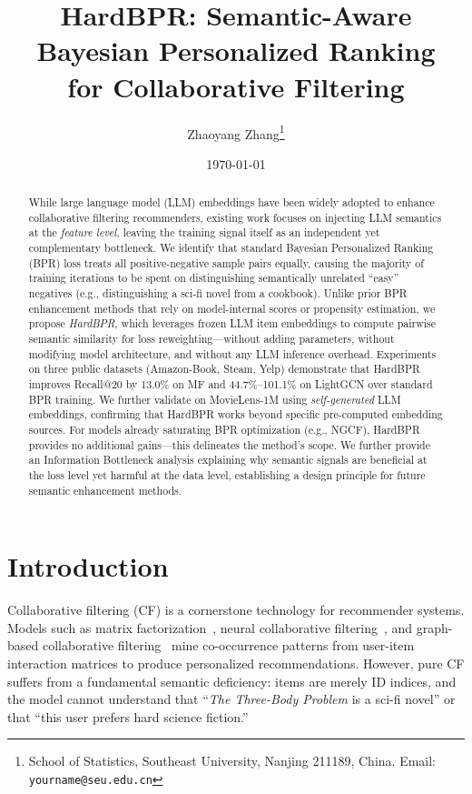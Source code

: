 \documentclass[11pt,a4paper]{article}
\title{\bfseries HardBPR: Semantic-Aware Bayesian Personalized Ranking\\for Collaborative Filtering}
\author{Zhaoyang Zhang\thanks{School of Statistics, Southeast University, Nanjing 211189, China. Email: \texttt{yourname@seu.edu.cn}}}
\date{\today}
\begin{document}
\maketitle

\begin{abstract}
While large language model (LLM) embeddings have been widely adopted to enhance collaborative filtering recommenders, existing work focuses on injecting LLM semantics at the \emph{feature level}, leaving the training signal itself as an independent yet complementary bottleneck. We identify that standard Bayesian Personalized Ranking (BPR) loss treats all positive-negative sample pairs equally, causing the majority of training iterations to be spent on distinguishing semantically unrelated ``easy'' negatives (e.g., distinguishing a sci-fi novel from a cookbook). Unlike prior BPR enhancement methods that rely on model-internal scores or propensity estimation, we propose \emph{HardBPR}, which leverages frozen LLM item embeddings to compute pairwise semantic similarity for loss reweighting---without adding parameters, without modifying model architecture, and without any LLM inference overhead. Experiments on three public datasets (Amazon-Book, Steam, Yelp) demonstrate that HardBPR improves Recall@20 by 13.0\% on MF and 44.7\%--101.1\% on LightGCN over standard BPR training. We further validate on MovieLens-1M using \emph{self-generated} LLM embeddings, confirming that HardBPR works beyond specific pre-computed embedding sources. For models already saturating BPR optimization (e.g., NGCF), HardBPR provides no additional gains---this delineates the method's scope. We further provide an Information Bottleneck analysis explaining why semantic signals are beneficial at the loss level yet harmful at the data level, establishing a design principle for future semantic enhancement methods.
\end{abstract}

\section{Introduction}

Collaborative filtering (CF) is a cornerstone technology for recommender systems. Models such as matrix factorization~\cite{Koren2009}, neural collaborative filtering~\cite{He2017NCF}, and graph-based collaborative filtering~\cite{He2020LightGCN} mine co-occurrence patterns from user-item interaction matrices to produce personalized recommendations. However, pure CF suffers from a fundamental semantic deficiency: items are merely ID indices, and the model cannot understand that ``\emph{The Three-Body Problem} is a sci-fi novel'' or that ``this user prefers hard science fiction.''
\end{document}
